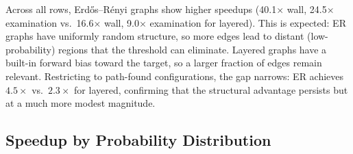 \begin{table}[htbp]
\centering
\renewcommand{\arraystretch}{1.3}
\caption[Speedup by graph type]{Median speedups at $\tau = 0.01$ by graph type. ``All'' includes termination-without-path rows.}
\label{table:speedup_graph_type}
\end{table}

Across all rows, Erd\H{o}s--R\'{e}nyi graphs show higher speedups (40.1$\times$ wall, 24.5$\times$ examination vs.\ 16.6$\times$ wall, 9.0$\times$ examination for layered). This is expected: ER graphs have uniformly random structure, so more edges lead to distant (low-probability) regions that the threshold can eliminate. Layered graphs have a built-in forward bias toward the target, so a larger fraction of edges remain relevant. Restricting to path-found configurations, the gap narrows: ER achieves $4.5\times$ vs.\ $2.3\times$ for layered, confirming that the structural advantage persists but at a much more modest magnitude.

\subsection{Speedup by Probability Distribution}

\begin{table}[htbp]
\centering
\renewcommand{\arraystretch}{1.3}
\caption[Speedup by probability distribution]{Median speedups at $\tau = 0.01$ by probability distribution. ``All'' includes termination-without-path rows; ``found'' is restricted to path-found rows.}
\label{table:speedup_dist}
\end{table}

